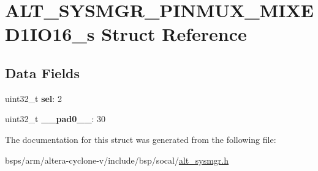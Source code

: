 \hypertarget{structALT__SYSMGR__PINMUX__MIXED1IO16__s}{}\section{A\+L\+T\+\_\+\+S\+Y\+S\+M\+G\+R\+\_\+\+P\+I\+N\+M\+U\+X\+\_\+\+M\+I\+X\+E\+D1\+I\+O16\+\_\+s Struct Reference}
\label{structALT__SYSMGR__PINMUX__MIXED1IO16__s}
\subsection*{Data Fields}
\begin{DoxyCompactItemize}
\item 
\mbox{\label{structALT__SYSMGR__PINMUX__MIXED1IO16__s_a44144e23e26a2f1c09040623b0927faf}} 
uint32\+\_\+t {\bfseries sel}\+: 2
\item 
\mbox{\label{structALT__SYSMGR__PINMUX__MIXED1IO16__s_a62ac42cf7d3608d66bc486ca38faa4ff}} 
uint32\+\_\+t {\bfseries \+\_\+\+\_\+pad0\+\_\+\+\_\+}\+: 30
\end{DoxyCompactItemize}


The documentation for this struct was generated from the following file\+:\begin{DoxyCompactItemize}
\item 
bsps/arm/altera-\/cyclone-\/v/include/bsp/socal/\mbox{\hyperlink{alt__sysmgr_8h}{alt\+\_\+sysmgr.\+h}}\end{DoxyCompactItemize}

